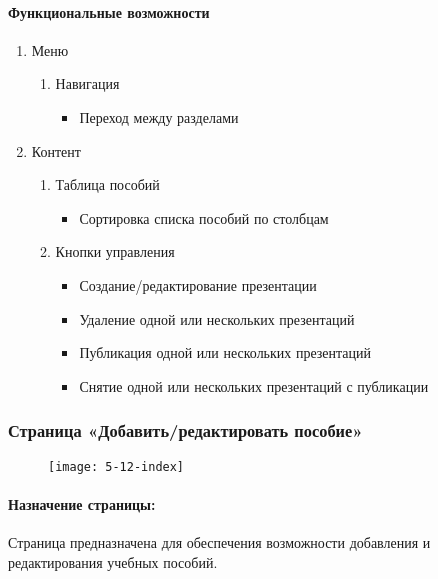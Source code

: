 \paragraph{Функциональные возможности}
\begin{enumerate}
	\item Меню
	\begin{enumerate}
		\item Навигация
		\begin{itemize}
			\item Переход между разделами
		\end{itemize}
	\end{enumerate}

	\item Контент
	\begin{enumerate}
		\item Таблица пособий
		\begin{itemize}
			\item Сортировка списка пособий по столбцам
		\end{itemize}

		\item Кнопки управления
		\begin{itemize}
			\item Создание/редактирование презентации
			\item Удаление одной или нескольких презентаций
			\item Публикация одной или нескольких презентаций
			\item Снятие одной или нескольких презентаций с публикации
		\end{itemize}
	\end{enumerate}
\end{enumerate}


\subsubsection{Страница «Добавить/редактировать пособие»}
\begin{figure}[H]
	\texttt{[image: 5-12-index]}
\end{figure}
\paragraph{Назначение страницы:} Страница предназначена для обеспечения возможности добавления и редактирования учебных пособий.

